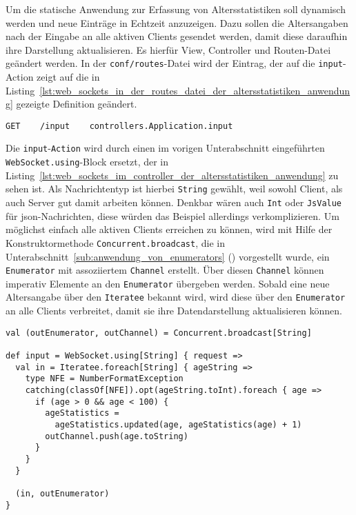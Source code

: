 Um die statische Anwendung zur Erfassung von Altersstatistiken soll dynamisch werden und neue Einträge in Echtzeit anzuzeigen.
Dazu sollen die Altersangaben nach der Eingabe an alle aktiven Clients gesendet werden, damit diese daraufhin ihre Darstellung aktualisieren.
Es hierfür View, Controller und Routen-Datei geändert werden.
In der \lstinline|conf/routes|-Datei wird der Eintrag, der auf die \lstinline|input|-Action zeigt auf die in Listing~\ref{lst:web_sockets_in_der_routes_datei_der_altersstatistiken_anwendung} gezeigte Definition geändert.

\begin{lstlisting}[caption=Web-Sockets in der routes-Datei der Altersstatistiken-Anwendung, label=lst:web_sockets_in_der_routes_datei_der_altersstatistiken_anwendung]
GET    /input    controllers.Application.input
\end{lstlisting}

Die \lstinline|input|-\lstinline|Action| wird durch einen im vorigen Unterabschnitt eingeführten \lstinline|WebSocket.using|-Block ersetzt, der in Listing~\ref{lst:web_sockets_im_controller_der_altersstatistiken_anwendung} zu sehen ist.
Als Nachrichtentyp ist hierbei \lstinline|String| gewählt, weil sowohl Client, als auch Server gut damit arbeiten können.
Denkbar wären auch \lstinline|Int| oder \lstinline|JsValue| für \gls{json}-Nachrichten, diese würden das Beispiel allerdings verkomplizieren.
Um möglichst einfach alle aktiven Clients erreichen zu können, wird mit Hilfe der Konstruktormethode \lstinline|Concurrent.broadcast|, die in Unterabschnitt~\ref{sub:anwendung_von_enumerators} () vorgestellt wurde, ein \lstinline|Enumerator| mit assoziiertem \lstinline|Channel| erstellt.
Über diesen \lstinline|Channel| können imperativ Elemente an den \lstinline|Enumerator| übergeben werden.
Sobald eine neue Altersangabe über den \lstinline|Iteratee| bekannt wird, wird diese über den \lstinline|Enumerator| an alle Clients verbreitet, damit sie ihre Datendarstellung aktualisieren können.

\begin{lstlisting}[caption=Web-Sockets im Controller der Altersstatistiken-Anwendung, label=lst:web_sockets_im_controller_der_altersstatistiken_anwendung]
val (outEnumerator, outChannel) = Concurrent.broadcast[String]

def input = WebSocket.using[String] { request =>
  val in = Iteratee.foreach[String] { ageString =>
    type NFE = NumberFormatException
    catching(classOf[NFE]).opt(ageString.toInt).foreach { age =>
      if (age > 0 && age < 100) {
        ageStatistics =
          ageStatistics.updated(age, ageStatistics(age) + 1)
        outChannel.push(age.toString)
      }
    }
  }

  (in, outEnumerator)
}
\end{lstlisting}

